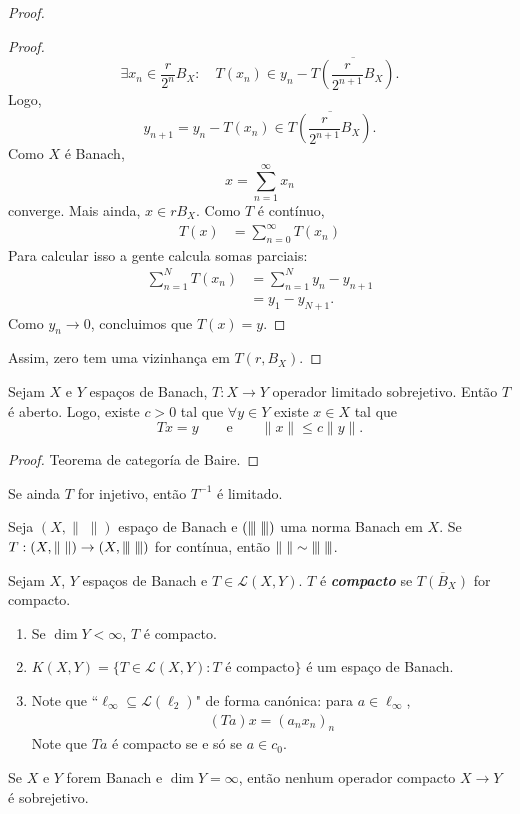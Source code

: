\documentclass[portuguese]{article}
\theoremstyle{definition}
\newcommand{\vertiii}[1]{{\left\vert\kern-0.25ex\left\vert\kern-0.25ex\left\vert #1 
		\right\vert\kern-0.25ex\right\vert\kern-0.25ex\right\vert}}
\begin{document}
\begin{proof}
\begin{proof}
			\[\exists x_n\in \frac{r}{2^n}B_X:\quad T(x_n)\in y_n-\overline{T\left(\frac{r}{2^{n+1}}B_X\right)}.\]
			Logo,
			\[y_{n+1}=y_n-T(x_n)\in\overline{T\left(\frac{r}{2^{n+1}}B_X\right)}.\]
			Como $X$ é Banach,
			\[x=\sum_{n=1}^\infty x_n\]
			converge. Mais ainda, $x\in rB_X$. Como $T$ é contínuo,
			\begin{align*}
				T(x)&=\sum_{n=0}^\infty T(x_n)
			\end{align*}
			Para calcular isso a gente calcula somas parciais:
			\begin{align*}
				\sum_{n=1}^NT(x_n)&=\sum_{n=1}^Ny_n-y_{n+1}\\
				&=y_1-y_{N+1}.
			\end{align*}
			Como $y_n\to 0$, concluimos que $T(x)=y$.
		\end{proof}
		Assim, zero tem uma vizinhança em $T(r,B_X)$.
	\end{proof}
	\begin{coro}
		Sejam $X$ e $Y$ espaços de Banach, $T:X\to Y$ operador limitado sobrejetivo. Então $T$ é aberto. Logo, existe $c>0$ tal que $\forall y\in Y$ existe $x\in X$ tal que
		\[Tx=y\qquad\text{e}\qquad \|x\|\leq c\|y\|.\]
	\end{coro}
	\begin{proof}
		Teorema de categoría de Baire.
	\end{proof}
	\begin{coro}
		Se ainda $T$ for injetivo, então $T^{-1}$ é limitado.
	\end{coro}
	\begin{coro}
		Seja $(X,\|\;\|)$ espaço de Banach e $(\vertiii{\;})$ uma norma Banach em $X$. Se $T:(X,\|\;\|)\to(X,\vertiii{\;})$ for contínua, então $\|\;\|\sim\vertiii{\;}$.
	\end{coro}

\begin{defn}
	Sejam $X$, $Y$ espaços de Banach e $T\in\mathcal{L}(X,Y)$. $T$ é \textbf{\textit{compacto}} se $\overline{T(B_X)}$ for compacto.
\end{defn}
\begin{exemplos}\leavevmode
	\begin{enumerate}
		\item Se $\dim Y<\infty$, $T$ é compacto.
		\item $K(X,Y)=\{T\in\mathcal{L}(X,Y):T\text{ é compacto}\}$ é um espaço de Banach.
		\item Note que ``$\ell_\infty\subseteq \mathcal{L}(\ell_2)$" de forma canónica: para $a\in\ell_\infty$,
		\begin{align*}
			(Ta)x=(a_nx_n)_n
		\end{align*}
		{\color{orange}Note que $Ta$ é compacto se e só se $a\in c_0$.}
	\end{enumerate}
\end{exemplos}
\begin{coro}
	Se $X$ e $Y$ forem Banach e $\dim Y=\infty$, então nenhum operador compacto $X\to Y$ é sobrejetivo.
\end{coro}
\end{document}
